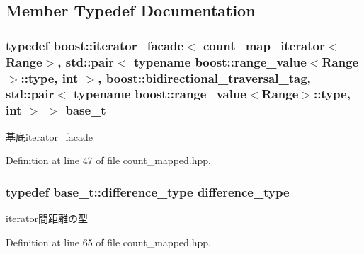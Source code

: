 \subsection{\-Member \-Typedef \-Documentation}
\hypertarget{classyuh_1_1range__detail_1_1count__map__iterator_abca93b0083606f7327745d6baae94316}{
\subsubsection[{base\-\_\-t}]{\setlength{\rightskip}{0pt plus 5cm}typedef boost\-::iterator\-\_\-facade$<$ {\bf count\-\_\-map\-\_\-iterator}$<$\-Range$>$, std\-::pair$<$ typename boost\-::range\-\_\-value$<$\-Range$>$\-::type, int $>$, boost\-::bidirectional\-\_\-traversal\-\_\-tag, std\-::pair$<$ typename boost\-::range\-\_\-value$<$\-Range$>$\-::type, int $>$ $>$ {\bf base\-\_\-t}}}\label{d1/def/classyuh_1_1range__detail_1_1count__map__iterator_abca93b0083606f7327745d6baae94316}
基底iterator\-\_\-facade 

\-Definition at line 47 of file count\-\_\-mapped.\-hpp.

\hypertarget{classyuh_1_1range__detail_1_1count__map__iterator_a9ac6039762e1b262cecb98589ffc1d75}{
\subsubsection[{difference\-\_\-type}]{\setlength{\rightskip}{0pt plus 5cm}typedef base\-\_\-t\-::difference\-\_\-type {\bf difference\-\_\-type}}}\label{d1/def/classyuh_1_1range__detail_1_1count__map__iterator_a9ac6039762e1b262cecb98589ffc1d75}
iterator間距離の型 

\-Definition at line 65 of file count\-\_\-mapped.\-hpp.

